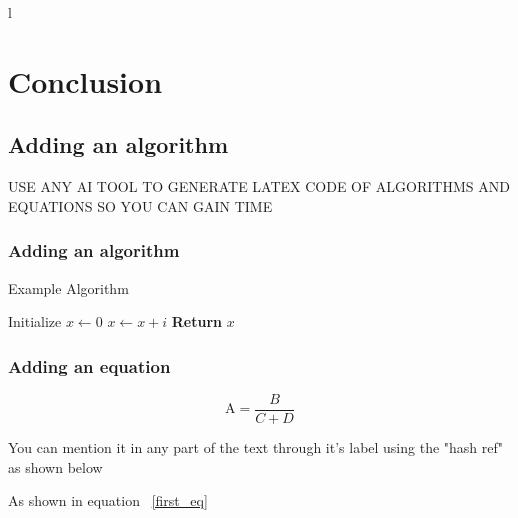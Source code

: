 l\chapter{Conclusion}
\section{Adding an algorithm}

 USE ANY AI TOOL TO GENERATE LATEX CODE OF ALGORITHMS AND EQUATIONS SO YOU CAN GAIN TIME 

\subsection{Adding an algorithm}

\begin{algorithm}
\caption{Example Algorithm}
\begin{algorithmic}[1]  %
\State Initialize $x \gets 0$
    \State $x \gets x + i$
\EndFor
\State \textbf{Return} $x$
\end{algorithmic}
\end{algorithm}

\subsection{Adding an equation}
        \begin{equation}
        \text{A} = \frac{B}{C + D} 
        \label{first_eq}
        \end{equation}
        
You can mention it in any part of the text through it's label using the "hash ref" as shown below 

As shown in equation ~\ref{first_eq} %